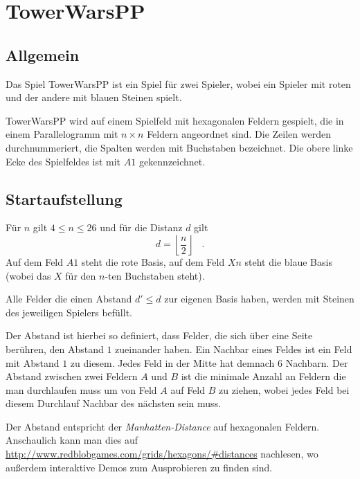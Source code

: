 \section*{TowerWarsPP}
\newcommand{\myAlph}[1]{\char\numexpr`A-1+#1\relax}
\newcommand{\myalph}[1]{\char\numexpr`a-1+#1\relax}

\subsection*{Allgemein}
Das Spiel TowerWarsPP ist ein Spiel für zwei Spieler, wobei ein Spieler mit roten und der andere mit blauen Steinen spielt.

TowerWarsPP wird auf einem Spielfeld mit hexagonalen Feldern gespielt, die in einem Parallelogramm mit $n \times n$ Feldern angeordnet sind. Die Zeilen werden durchnummeriert, die Spalten werden mit Buchstaben bezeichnet. Die obere linke Ecke des Spielfeldes ist mit $A1$ gekennzeichnet.

\subsection*{Startaufstellung}
Für $n$ gilt $4 \le n \le 26$ und für die Distanz $d$ gilt 
\[d = \left\lfloor \frac{n}{2}\right\rfloor\hspace{10pt}.\] 
Auf dem Feld $A1$ steht die rote Basis, auf dem Feld $Xn$ steht die blaue Basis (wobei das $X$ für den $n$-ten Buchstaben steht). 

Alle Felder die einen Abstand $d' \le d$ zur eigenen Basis haben, werden mit Steinen des jeweiligen Spielers befüllt. 


Der Abstand ist hierbei so definiert, dass Felder, die sich über eine Seite berühren, den Abstand $1$ zueinander haben. Ein Nachbar eines Feldes ist ein Feld mit Abstand $1$ zu diesem. Jedes Feld in der Mitte hat demnach $6$ Nachbarn. Der Abstand zwischen zwei Feldern $A$ und $B$ ist die minimale Anzahl an Feldern die man durchlaufen muss um von Feld $A$ auf Feld $B$ zu ziehen, wobei jedes Feld bei diesem Durchlauf Nachbar des nächsten sein muss.

Der Abstand entspricht der \textit{Manhatten-Distance} auf hexagonalen Feldern. Anschaulich kann man dies auf \href{http://www.redblobgames.com/grids/hexagons/#distances}{http://www.redblobgames.com/grids/hexagons/\#distances} nachlesen, wo außerdem interaktive Demos zum Ausprobieren zu finden sind.

